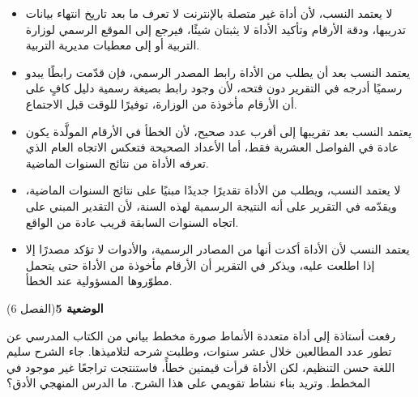 \documentclass[11pt,a4paper]{article}
\begin{document}
\begin{itemize}[leftmargin=1.0cm, labelsep=6pt, itemsep=3pt, topsep=4pt, parsep=0pt]
  \item[\textbf{أ)}] لا يعتمد النسب، لأن أداة غير متصلة بالإنترنت لا تعرف ما بعد تاريخ انتهاء بيانات تدريبها، ودقة الأرقام وتأكيد الأداة لا يثبتان شيئًا، فيرجع إلى الموقع الرسمي لوزارة التربية أو إلى معطيات مديرية التربية.
  \item[\textbf{ب)}] يعتمد النسب بعد أن يطلب من الأداة رابط المصدر الرسمي، فإن قدّمت رابطًا يبدو رسميًا أدرجه في التقرير دون فتحه، لأن وجود رابط بصيغة رسمية دليل كافٍ على أن الأرقام مأخوذة من الوزارة، توفيرًا للوقت قبل الاجتماع.
  \item[\textbf{ج)}] يعتمد النسب بعد تقريبها إلى أقرب عدد صحيح، لأن الخطأ في الأرقام المولَّدة يكون عادة في الفواصل العشرية فقط، أما الأعداد الصحيحة فتعكس الاتجاه العام الذي تعرفه الأداة من نتائج السنوات الماضية.
  \item[\textbf{د)}] لا يعتمد النسب، ويطلب من الأداة تقديرًا جديدًا مبنيًا على نتائج السنوات الماضية، ويقدّمه في التقرير على أنه النتيجة الرسمية لهذه السنة، لأن التقدير المبني على اتجاه السنوات السابقة قريب عادة من الواقع.
  \item[\textbf{هـ)}] يعتمد النسب لأن الأداة أكدت أنها من المصادر الرسمية، والأدوات لا تؤكد مصدرًا إلا إذا اطلعت عليه، ويذكر في التقرير أن الأرقام مأخوذة من الأداة حتى يتحمل مطوّروها المسؤولية عند الخطأ.
\end{itemize}
\par\vspace{6pt}
\noindent
{\large\khatt\textbf{الوضعية 5}}\hfill{\small(الفصل 6)}\par\nopagebreak\vspace{3pt}
\setlength{\fboxsep}{7pt}\colorbox{gray!10}{\parbox{\dimexpr\linewidth-14pt}{رفعت أستاذة إلى أداة متعددة الأنماط صورة مخطط بياني من الكتاب المدرسي عن تطور عدد المطالعين خلال عشر سنوات، وطلبت شرحه لتلاميذها. جاء الشرح سليم اللغة حسن التنظيم، لكن الأداة قرأت قيمتين خطأً، فاستنتجت تراجعًا غير موجود في المخطط. وتريد بناء نشاط تقويمي على هذا الشرح. ما الدرس المنهجي الأدق؟}}\par\nopagebreak
\end{document}
